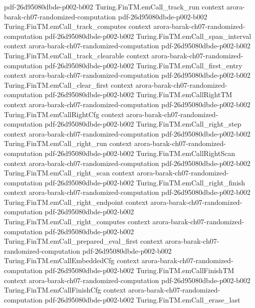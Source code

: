 \begin{theorem}
  {pdf-26d95080dbde-p002-b002}
\proofstep
  {Turing.FinTM.emCall_track_run}
  {context}
  {arora-barak-ch07-randomized-computation}
  {pdf-26d95080dbde-p002-b002}
\proofstep
  {Turing.FinTM.emCall_track_computes}
  {context}
  {arora-barak-ch07-randomized-computation}
  {pdf-26d95080dbde-p002-b002}
\proofstep
  {Turing.FinTM.emCall_span_interval}
  {context}
  {arora-barak-ch07-randomized-computation}
  {pdf-26d95080dbde-p002-b002}
\proofstep
  {Turing.FinTM.emCall_track_clearable}
  {context}
  {arora-barak-ch07-randomized-computation}
  {pdf-26d95080dbde-p002-b002}
\proofstep
  {Turing.FinTM.emCall_first_entry}
  {context}
  {arora-barak-ch07-randomized-computation}
  {pdf-26d95080dbde-p002-b002}
\proofstep
  {Turing.FinTM.emCall_clear_first}
  {context}
  {arora-barak-ch07-randomized-computation}
  {pdf-26d95080dbde-p002-b002}
\proofstep
  {Turing.FinTM.emCallRightTM}
  {context}
  {arora-barak-ch07-randomized-computation}
  {pdf-26d95080dbde-p002-b002}
\proofstep
  {Turing.FinTM.emCallRightCfg}
  {context}
  {arora-barak-ch07-randomized-computation}
  {pdf-26d95080dbde-p002-b002}
\proofstep
  {Turing.FinTM.emCall_right_step}
  {context}
  {arora-barak-ch07-randomized-computation}
  {pdf-26d95080dbde-p002-b002}
\proofstep
  {Turing.FinTM.emCall_right_run}
  {context}
  {arora-barak-ch07-randomized-computation}
  {pdf-26d95080dbde-p002-b002}
\proofstep
  {Turing.FinTM.emCallRightScan}
  {context}
  {arora-barak-ch07-randomized-computation}
  {pdf-26d95080dbde-p002-b002}
\proofstep
  {Turing.FinTM.emCall_right_scan}
  {context}
  {arora-barak-ch07-randomized-computation}
  {pdf-26d95080dbde-p002-b002}
\proofstep
  {Turing.FinTM.emCall_right_finish}
  {context}
  {arora-barak-ch07-randomized-computation}
  {pdf-26d95080dbde-p002-b002}
\proofstep
  {Turing.FinTM.emCall_right_endpoint}
  {context}
  {arora-barak-ch07-randomized-computation}
  {pdf-26d95080dbde-p002-b002}
\proofstep
  {Turing.FinTM.emCall_right_computes}
  {context}
  {arora-barak-ch07-randomized-computation}
  {pdf-26d95080dbde-p002-b002}
\proofstep
  {Turing.FinTM.emCall_prepared_eval_first}
  {context}
  {arora-barak-ch07-randomized-computation}
  {pdf-26d95080dbde-p002-b002}
\proofstep
  {Turing.FinTM.emCallEmbeddedCfg}
  {context}
  {arora-barak-ch07-randomized-computation}
  {pdf-26d95080dbde-p002-b002}
\proofstep
  {Turing.FinTM.emCallFinishTM}
  {context}
  {arora-barak-ch07-randomized-computation}
  {pdf-26d95080dbde-p002-b002}
\proofstep
  {Turing.FinTM.emCallFinishCfg}
  {context}
  {arora-barak-ch07-randomized-computation}
  {pdf-26d95080dbde-p002-b002}
\proofstep
  {Turing.FinTM.emCall_erase_last}

\end{theorem}
